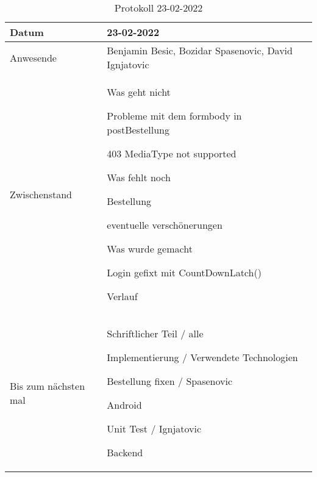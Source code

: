 \begin{table}
    \begin{tabular}{ |p{3cm}|p{10cm}|  }
        \hline
        Datum & 23-02-2022\\
        \hline
        Anwesende & Benjamin Besic, Bozidar Spasenovic, David Ignjatovic\\

        \hline
        Zwischenstand& Was geht nicht

        Probleme mit dem formbody in postBestellung
    
            403 MediaType not supported
    
    Was fehlt noch
    
        Bestellung
    
        eventuelle verschönerungen
    
     Was wurde gemacht
    
        Login gefixt mit CountDownLatch()
    
        Verlauf
    
    \\
        \hline
        Bis zum nächsten mal &  

        Schriftlicher Teil / alle
    
            Implementierung / Verwendete Technologien
    
        Bestellung fixen / Spasenovic
    
            Android
    
        Unit Test / Ignjatovic
    
            Backend
    
    \\
        \hline
    \end{tabular}
    \caption{Protokoll 23-02-2022}
    \label{tab:my_label}
\end{table}




